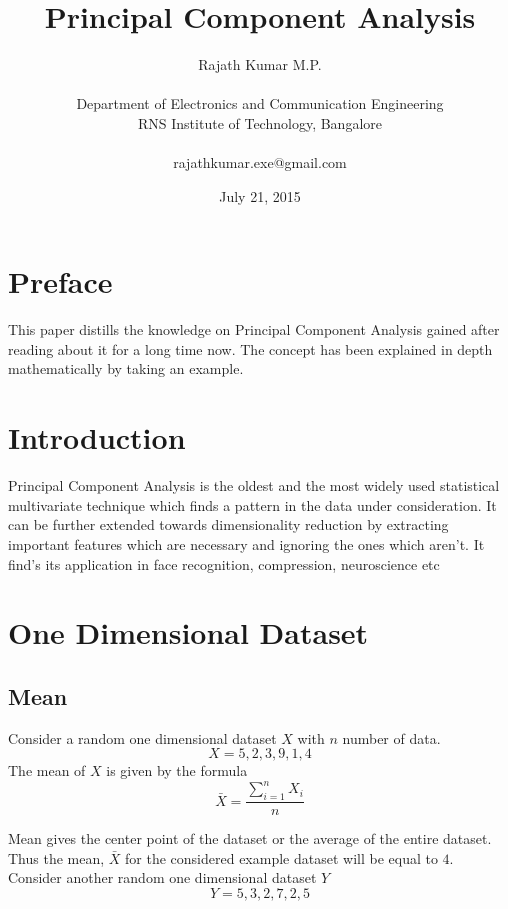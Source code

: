 \documentclass[a4paper]{article}
\begin{document}
\begin{titlepage}
	\title{\Huge{Principal Component Analysis}}
	\author{Rajath Kumar M.P. \\ \\  Department of Electronics and Communication Engineering \\ RNS Institute of Technology, Bangalore \\ \\rajathkumar.exe@gmail.com}
	\date{July 21, 2015}
	\maketitle
	\thispagestyle{empty}
\end{titlepage}

\thispagestyle{empty}
\tableofcontents
\cleardoublepage
{}


\newpage
\section{Preface}\label{sec:pro}
This paper distills the knowledge on Principal Component Analysis gained after reading about it for a long time now. The concept has been explained in depth mathematically by taking an example.

\section{Introduction}
Principal Component Analysis is the oldest and the most widely used statistical multivariate technique which finds a pattern in the data under consideration. It can be further extended towards dimensionality reduction by extracting important features which are necessary and ignoring the ones which aren't. It find's its application in face recognition, compression, neuroscience etc

\section{One Dimensional Dataset }\label{sec:oned}
\subsection{Mean}
Consider a random one dimensional dataset $X$ with $n$ number of data.
$$X = { 5,2,3,9,1,4 }$$
The mean of $X$ is given by the formula
$${\bar{X} = \frac{ \sum_ {i=1}^n X_i}{n}}$$

Mean gives the center point of the dataset or the average of the entire dataset. Thus the mean, $\bar{X}$ for the considered example dataset will be equal to $4$.
\newline
\parskip 0pt
\\ 
Consider another random one dimensional dataset $Y$
$$Y = { 5,3,2,7,2,5 }$$
\end{document}
